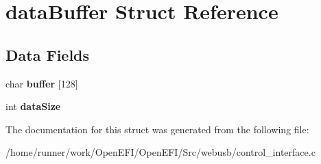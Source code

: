 \hypertarget{structdataBuffer}{}\section{data\+Buffer Struct Reference}
\label{structdataBuffer}
\subsection*{Data Fields}
\begin{DoxyCompactItemize}
\item 
\mbox{\label{structdataBuffer_a1521e8a16f2ef1af5dbb35c6d3d8f0c0}} 
char {\bfseries buffer} \mbox{[}128\mbox{]}
\item 
\mbox{\label{structdataBuffer_af378ad66ff17549966ad59ac2f65ad54}} 
int {\bfseries data\+Size}
\end{DoxyCompactItemize}


The documentation for this struct was generated from the following file\+:\begin{DoxyCompactItemize}
\item 
/home/runner/work/\+Open\+E\+F\+I/\+Open\+E\+F\+I/\+Src/webusb/control\+\_\+interface.\+c\end{DoxyCompactItemize}
